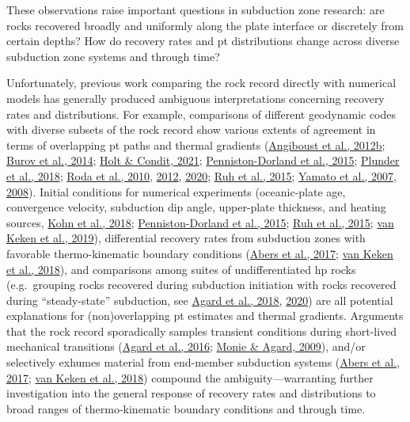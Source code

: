 \noindent These observations raise important questions in subduction zone research: are rocks recovered broadly and uniformly along the plate interface or discretely from certain depths? How do recovery rates and \gls{pt} distributions change across diverse subduction zone systems and through time?

Unfortunately, previous work comparing the rock record directly with numerical models has generally produced ambiguous interpretations concerning recovery rates and distributions. For example, comparisons of different geodynamic codes with diverse subsets of the rock record show various extents of agreement in terms of overlapping \gls{pt} paths and thermal gradients (\protect\hyperlink{ref-angiboust2012b}{Angiboust et al., 2012b}; \protect\hyperlink{ref-burov2014}{Burov et al., 2014}; \protect\hyperlink{ref-holt2021}{Holt \& Condit, 2021}; \protect\hyperlink{ref-penniston2015}{Penniston-Dorland et al., 2015}; \protect\hyperlink{ref-plunder2018}{Plunder et al., 2018}; \protect\hyperlink{ref-roda2010}{Roda et al., 2010}, \protect\hyperlink{ref-roda2012}{2012}, \protect\hyperlink{ref-roda2020}{2020}; \protect\hyperlink{ref-ruh2015}{Ruh et al., 2015}; \protect\hyperlink{ref-yamato2007}{Yamato et al., 2007}, \protect\hyperlink{ref-yamato2008}{2008}). Initial conditions for numerical experiments (oceanic-plate age, convergence velocity, subduction dip angle, upper-plate thickness, and heating sources, \protect\hyperlink{ref-kohn2018}{Kohn et al., 2018}; \protect\hyperlink{ref-penniston2015}{Penniston-Dorland et al., 2015}; \protect\hyperlink{ref-ruh2015}{Ruh et al., 2015}; \protect\hyperlink{ref-vankeken2019}{van Keken et al., 2019}), differential recovery rates from subduction zones with favorable thermo-kinematic boundary conditions (\protect\hyperlink{ref-abers2017}{Abers et al., 2017}; \protect\hyperlink{ref-vankeken2018}{van Keken et al., 2018}), and comparisons among suites of undifferentiated \gls{hp} rocks (e.g.~grouping rocks recovered during subduction initiation with rocks recovered during ``steady-state'' subduction, see \protect\hyperlink{ref-agard2018}{Agard et al., 2018}, \protect\hyperlink{ref-agard2020}{2020}) are all potential explanations for (non)overlapping \gls{pt} estimates and thermal gradients. Arguments that the rock record sporadically samples transient conditions during short-lived mechanical transitions (\protect\hyperlink{ref-agard2016}{Agard et al., 2016}; \protect\hyperlink{ref-monie2009}{Monie \& Agard, 2009}), and/or selectively exhumes material from end-member subduction systems (\protect\hyperlink{ref-abers2017}{Abers et al., 2017}; \protect\hyperlink{ref-vankeken2018}{van Keken et al., 2018}) compound the ambiguity---warranting further investigation into the general response of recovery rates and distributions to broad ranges of thermo-kinematic boundary conditions and through time.

